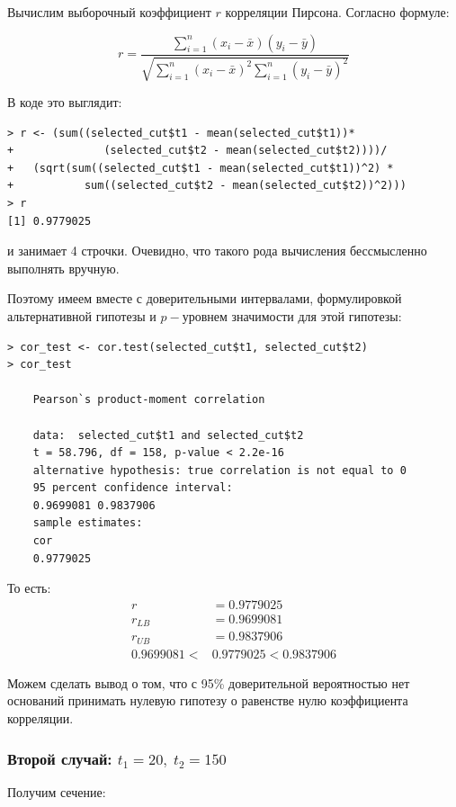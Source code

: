\documentclass[14pt,a4paper]{scrartcl}
\begin{document}
Вычислим выборочный коэффициент $r$ корреляции Пирсона. Согласно формуле:

\begin{equation*}
	r=\frac{\sum_{i=1}^{n}\left(x_{i}-\bar{x}\right)\left(y_{i}-\bar{y}\right)}{\sqrt{\sum_{i=1}^{n}\left(x_{i}-\bar{x}\right)^{2} \sum_{i=1}^{n}\left(y_{i}-\bar{y}\right)^{2}}}
\end{equation*}

В коде это выглядит:

\begin{verbatim}
> r <- (sum((selected_cut$t1 - mean(selected_cut$t1))*
+              (selected_cut$t2 - mean(selected_cut$t2))))/ 
+   (sqrt(sum((selected_cut$t1 - mean(selected_cut$t1))^2) *
+           sum((selected_cut$t2 - mean(selected_cut$t2))^2)))
> r
[1] 0.9779025
\end{verbatim}

и занимает 4 строчки. Очевидно, что такого рода вычисления бессмысленно выполнять вручную. 
\pagebreak

Поэтому имеем вместе с доверительными интервалами, формулировкой альтернативной гипотезы и $p-$уровнем значимости для этой гипотезы:
\begin{verbatim}
> cor_test <- cor.test(selected_cut$t1, selected_cut$t2)
> cor_test

	Pearson`s product-moment correlation
	
	data:  selected_cut$t1 and selected_cut$t2
	t = 58.796, df = 158, p-value < 2.2e-16
	alternative hypothesis: true correlation is not equal to 0
	95 percent confidence interval:
	0.9699081 0.9837906
	sample estimates:
	cor 
	0.9779025
\end{verbatim}

То есть:
\begin{align*}
	r &= 0.9779025\\
	r_{LB} &= 0.9699081\\
	r_{UB} &= 0.9837906\\
	0.9699081 < &0.9779025 < 0.9837906
\end{align*}

Можем сделать вывод о том, что с 95\% доверительной вероятностью нет оснований принимать нулевую гипотезу о равенстве нулю коэффициента корреляции.


\pagebreak
\subsubsection*{Второй случай: $t_1 = 20, \; t_2 = 150$}
Получим сечение:
\end{document}

